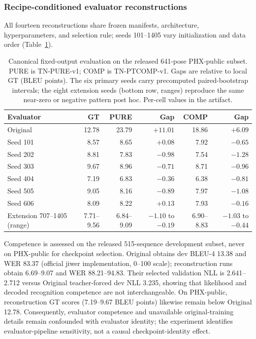 \documentclass[pdflatex,sn-chicago]{sn-jnl}
\begin{document}
\subsubsection{Recipe-conditioned evaluator reconstructions}
\label{sec:multiseed_factorial}
All fourteen reconstructions share frozen manifests, architecture, hyperparameters, and selection rule; seeds 101--1405 vary initialization and data order (Table~\ref{tab:multiseed_factorial}).

\begin{table}[h]
\centering
\scriptsize
\caption{Canonical fixed-output evaluation on the released 641-pose PHX-public subset. PURE is TN-PURE-v1; COMP is TN-PTCOMP-v1. Gaps are relative to local GT (BLEU points). The six primary seeds carry precomputed paired-bootstrap intervals; the eight extension seeds (bottom row, ranges) reproduce the same near-zero or negative pattern post hoc. Per-cell values in the artifact.}
\label{tab:multiseed_factorial}
\begin{tabular}{lrrrrr}
\toprule
Evaluator & GT & PURE & Gap & COMP & Gap \\
\midrule
Original & 12.78 & 23.79 & $\mathbf{+11.01}$ & 18.86 & $+6.09$ \\
Seed 101 & 8.57 & 8.65 & $+0.08$ & 7.92 & $-0.65$ \\
Seed 202 & 8.81 & 7.83 & $-0.98$ & 7.54 & $-1.28$ \\
Seed 303 & 9.67 & 8.96 & $-0.71$ & 8.71 & $-0.96$ \\
Seed 404 & 7.19 & 6.83 & $-0.36$ & 6.38 & $-0.81$ \\
Seed 505 & 9.05 & 8.16 & $-0.89$ & 7.97 & $-1.08$ \\
Seed 606 & 8.09 & 8.22 & $+0.13$ & 7.93 & $-0.16$ \\
\midrule
Extension 707--1405 (range) & 7.71--9.56 & 6.84--9.09 & $-1.10$ to $-0.19$ & 6.90--8.83 & $-1.03$ to $-0.44$ \\
\bottomrule
\end{tabular}
\end{table}

Competence is assessed on the released 515-sequence development subset, never on PHX-public for checkpoint selection. Original obtains dev BLEU-4 13.38 and WER 83.37 (official jiwer implementation, 0--100 scale); reconstruction runs obtain 6.69--9.07 and WER 88.21--94.83. Their selected validation NLL is 2.641--2.712 versus Original teacher-forced dev NLL 3.235, showing that likelihood and decoded recognition competence are not interchangeable. On PHX-public, reconstruction GT scores (7.19--9.67 BLEU points) likewise remain below Original 12.78. Consequently, evaluator competence and unavailable original-training details remain confounded with evaluator identity; the experiment identifies evaluator-pipeline sensitivity, not a causal checkpoint-identity effect.
\end{document}
